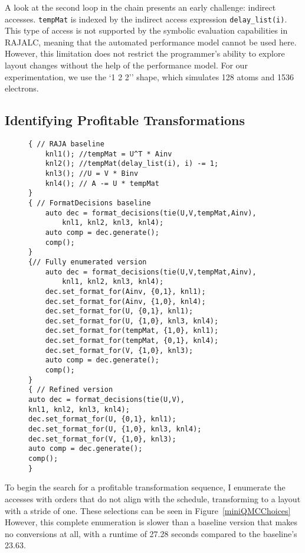 A look at the second loop in the chain presents an early challenge: indirect accesses. 
\verb.tempMat. is indexed by the indirect access expression \verb.delay_list(i).. 
This type of access is not supported by the symbolic evaluation capabilities in RAJALC, meaning that the automated performance model cannot be used here.
However, this limitation does not restrict the programmer's ability to explore layout changes without the help of the performance model. 
For our experimentation, we use the `1 2 2'' shape, which simulates 128 atoms and 1536 electrons.

\subsection{Identifying Profitable Transformations}
\begin{figure}
\begin{lstlisting}[caption={Different layout transformations selected as part of the miniQMC exploration.}, label={miniQMCChoices}]
{ // RAJA baseline
	knl1(); //tempMat = U^T * Ainv
	knl2(); //tempMat(delay_list(i), i) -= 1;
	knl3(); //U = V * Binv
	knl4(); // A -= U * tempMat
}
{ // FormatDecisions baseline
	auto dec = format_decisions(tie(U,V,tempMat,Ainv), 
		knl1, knl2, knl3, knl4);
	auto comp = dec.generate();
	comp();
}
{// Fully enumerated version
	auto dec = format_decisions(tie(U,V,tempMat,Ainv), 
		knl1, knl2, knl3, knl4);
	dec.set_format_for(Ainv, {0,1}, knl1);
	dec.set_format_for(Ainv, {1,0}, knl4);
	dec.set_format_for(U, {0,1}, knl1);
	dec.set_format_for(U, {1,0}, knl3, knl4);
	dec.set_format_for(tempMat, {1,0}, knl1);
	dec.set_format_for(tempMat, {0,1}, knl4);
	dec.set_format_for(V, {1,0}, knl3);
	auto comp = dec.generate();
	comp();
}
{ // Refined version
auto dec = format_decisions(tie(U,V), 
knl1, knl2, knl3, knl4);
dec.set_format_for(U, {0,1}, knl1);
dec.set_format_for(U, {1,0}, knl3, knl4);
dec.set_format_for(V, {1,0}, knl3);
auto comp = dec.generate();
comp();
}
\end{lstlisting}
\end{figure}

To begin the search for a profitable transformation sequence, I enumerate the accesses with orders that do not align with the schedule, transforming to a layout with a stride of one.
These selections can be seen in Figure~\ref{miniQMCChoices}
However, this complete enumeration is slower than a baseline \FormatDecisions{} version that makes no conversions at all, with a runtime of 27.28 seconds compared to the baseline's 23.63.

